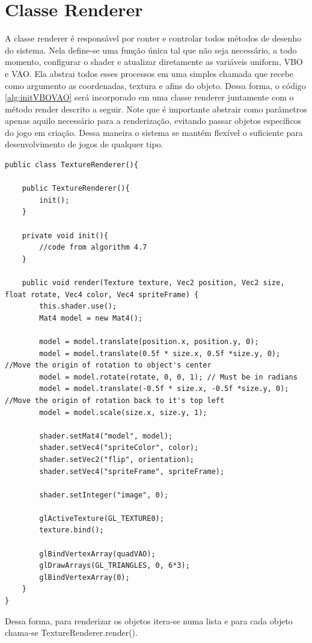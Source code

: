 \documentclass[12pt, 
openright, 
oneside, 
a4paper,    
brazil]{facom-ufu-abntex2}
\begin{document}
\section{Classe Renderer}
A classe renderer é responsável por conter e controlar todos métodos de desenho do sistema. Nela define-se uma função única tal que não seja necessário, a todo momento, configurar o shader e atualizar diretamente as variáveis uniform, VBO e VAO. Ela abstrai todos esses processos em uma simples chamada que recebe como argumento as coordenadas, textura e afins do objeto. Dessa forma, o código \ref{alg:initVBOVAO} será incorporado em uma classe renderer juntamente com o método render descrito a seguir. Note que é importante abstrair como parâmetros apenas aquilo necessário para a renderização, evitando passar objetos específicos do jogo em criação. Dessa maneira o sistema se mantém flexível o suficiente para desenvolvimento de jogos de qualquer tipo.


\begin{lstlisting}[caption=Classe renderer simples]
public class TextureRenderer(){

	public TextureRenderer(){
		init();
	}

	private void init(){
		//code from algorithm 4.7
	}

	public void render(Texture texture, Vec2 position, Vec2 size, float rotate, Vec4 color, Vec4 spriteFrame) {
		this.shader.use();
		Mat4 model = new Mat4();
		
		model = model.translate(position.x, position.y, 0);
		model = model.translate(0.5f * size.x, 0.5f *size.y, 0); //Move the origin of rotation to object's center
		model = model.rotate(rotate, 0, 0, 1); // Must be in radians
		model = model.translate(-0.5f * size.x, -0.5f *size.y, 0); //Move the origin of rotation back to it's top left
		model = model.scale(size.x, size.y, 1);
		
		shader.setMat4("model", model);
		shader.setVec4("spriteColor", color);
		shader.setVec2("flip", orientation);
		shader.setVec4("spriteFrame", spriteFrame);
		
		shader.setInteger("image", 0);
		
		glActiveTexture(GL_TEXTURE0);
		texture.bind();

		glBindVertexArray(quadVAO);
		glDrawArrays(GL_TRIANGLES, 0, 6*3);
		glBindVertexArray(0);
	}
}
\end{lstlisting}


Dessa forma, para renderizar os objetos itera-se numa lista e para cada objeto chama-se TextureRenderer.render().
\end{document}
